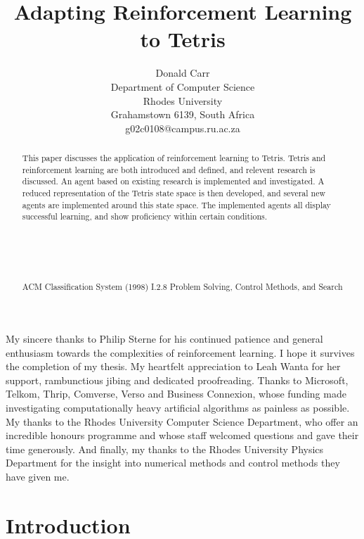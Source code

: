 \documentclass{rucsthesis}
\title{Adapting Reinforcement Learning to Tetris}
\author{Donald Carr \\ Department of Computer Science \\ Rhodes University \\ Grahamstown 6139, South Africa \\ g02c0108@campus.ru.ac.za}
\begin{document}
\maketitle

\begin{abstract}

This paper discusses the application of reinforcement learning to Tetris. Tetris and reinforcement learning are both introduced and defined, and relevent research is discussed. An agent based on existing research is implemented and investigated. A reduced representation of the Tetris state space is then developed, and several new agents are implemented around this state space. The implemented agents all display successful learning, and show proficiency within certain conditions.\\
\\
\\
\\
\\
\\
ACM Classification System (1998) I.2.8 Problem Solving, Control Methods, and Search

\end{abstract}

\begin{acknowledgements}

My sincere thanks to Philip Sterne for his continued patience and general enthusiasm towards the complexities of reinforcement learning. I hope it survives the completion of my thesis. My heartfelt appreciation to Leah Wanta for her support, rambunctious jibing and dedicated proofreading. Thanks to Microsoft, Telkom, Thrip, Comverse, Verso and Business Connexion, whose funding made investigating computationally heavy artificial algorithms as painless as possible. My thanks to the Rhodes University Computer Science Department, who offer an incredible honours programme and whose staff welcomed questions and gave their time generously. And finally, my thanks to the Rhodes University Physics Department for the insight into numerical methods and control methods they have given me.
\end{acknowledgements}

\tableofcontents
\pagebreak
\listoffigures
\pagebreak
\listoftables
\pagebreak

\chapter{Introduction}
\end{document}
